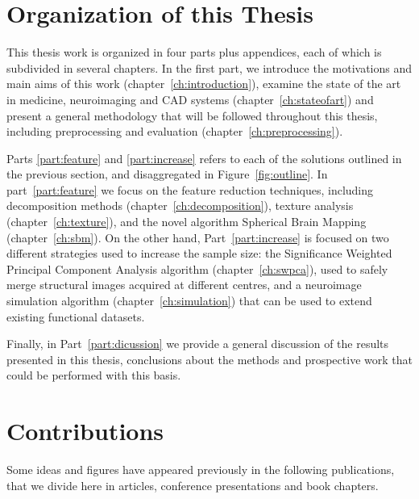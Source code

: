 \section{Organization of this Thesis}
This thesis work is organized in four parts plus appendices, each of which is subdivided in several chapters. In the first part, we introduce the motivations and main aims of this work (chapter~\ref{ch:introduction}), examine the state of the art in medicine, neuroimaging and \ac{CAD} systems (chapter~\ref{ch:stateofart}) and present a general methodology that will be followed throughout this thesis, including preprocessing and evaluation (chapter~\ref{ch:preprocessing}). 

Parts \ref{part:feature} and \ref{part:increase} refers to each of the solutions outlined in the previous section, and disaggregated in Figure~\ref{fig:outline}. In part~\ref{part:feature} we focus on the feature reduction techniques, including decomposition methods (chapter~\ref{ch:decomposition}), texture analysis (chapter~\ref{ch:texture}), and the novel algorithm Spherical Brain Mapping (chapter~\ref{ch:sbm}). On the other hand, Part~\ref{part:increase} is focused on two different strategies used to increase the sample size: the Significance Weighted Principal Component Analysis algorithm (chapter~\ref{ch:swpca}), used to safely merge structural images acquired at different centres, and a neuroimage simulation algorithm (chapter~\ref{ch:simulation}) that can be used to extend existing functional datasets. 

Finally, in Part~\ref{part:dicussion} we provide a general discussion of the results presented in this thesis, conclusions about the methods and prospective work that could be performed with this basis. 

\section{Contributions}
Some ideas and figures have appeared previously in the following publications, that we divide here in articles, conference presentations and book chapters. 


